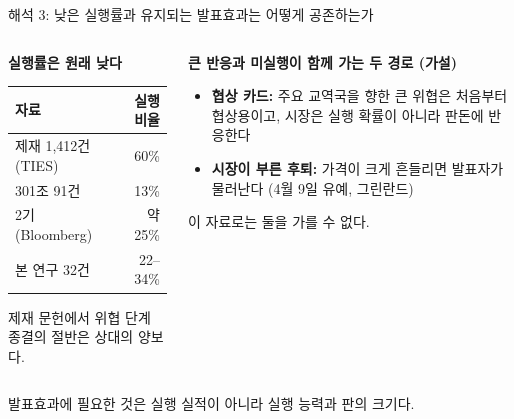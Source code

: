 \documentclass[aspectratio=169,9pt,t]{beamer}
\newcommand{\takeaway}[1]{%
  \par\vfill
  \noindent{\color{navy}\vrule width 1.6pt}\hspace{2.6mm}%
  \begin{minipage}[c]{\dimexpr\linewidth-5mm\relax}\small\linespread{1.15}\selectfont\RaggedRight #1\end{minipage}\par\vspace{1.2mm}}
\newcommand{\lab}[1]{{\small\bfseries\color{navy}#1}}
\newcommand{\tf}{\fontsize{8.2}{10.4}\selectfont}
\begin{document}
\begin{frame}{해석 3: 낮은 실행률과 유지되는 발표효과는 어떻게 공존하는가}
\begin{columns}[t,onlytextwidth]
\begin{column}{0.44\textwidth}
\lab{실행률은 원래 낮다}
\begingroup\tf
\begin{tabularx}{\linewidth}{@{}Yr@{}}
\toprule
자료 & 실행 비율\\
\midrule
제재 1,412건 (TIES) & 60\%\\
301조 91건 & 13\%\\
2기 (Bloomberg) & 약 25\%\\
본 연구 32건 & 22--34\%\\
\bottomrule
\end{tabularx}\endgroup
\vspace{1.5mm}
{\small\RaggedRight 제재 문헌에서 위협 단계 종결의 절반은 상대의 양보다.\par}
\end{column}
\begin{column}{0.52\textwidth}
\lab{큰 반응과 미실행이 함께 가는 두 경로 (가설)}
\begin{itemize}
\item \textbf{협상 카드:} 주요 교역국을 향한 큰 위협은 처음부터 협상용이고, 시장은 실행 확률이 아니라 판돈에 반응한다
\item \textbf{시장이 부른 후퇴:} 가격이 크게 흔들리면 발표자가 물러난다 (4월 9일 유예, 그린란드)
\end{itemize}
{\small\RaggedRight 이 자료로는 둘을 가를 수 없다.\par}
\end{column}
\end{columns}
\takeaway{발표효과에 필요한 것은 실행 실적이 아니라 실행 능력과 판의 크기다.}
\end{frame}
\end{document}
